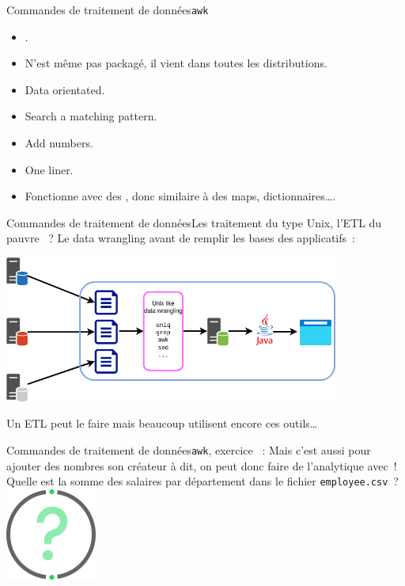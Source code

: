 \documentclass{beamer}
\begin{document}
    \begin{frame}{Commandes de traitement de données}{\lstinline{awk}}
        \begin{itemize}
            \item {}.
            \item N'est même pas packagé, il vient dans toutes les distributions.
            \item Data orientated.
            \item Search a matching pattern.
            \item Add numbers.
            \item One liner.
            \item Fonctionne avec des , donc similaire à des maps, dictionnaires\ldots.
        \end{itemize}
    \end{frame}

    \begin{frame}{Commandes de traitement de données}{Les traitement du type Unix, l'ETL du pauvre ~?}
        Le data wrangling avant de remplir les bases des applicatifs~:
        \begin{center}
            \includegraphics[width=11cm]{image/pre-traitement-unix.drawio}
        \end{center}
        Un ETL peut le faire mais beaucoup utilisent encore ces outils\ldots
    \end{frame}

    \begin{frame}{Commandes de traitement de données}{\lstinline{awk}, exercice \execcounterdispinc{}~:}
        Mais c'est aussi pour ajouter des nombres son créateur à dit, on peut donc faire de l'analytique avec~!
        \bigbreak
        Quelle est la somme des salaires par département dans le fichier \lstinline{employee.csv}~?
        \bigbreak
        \centering
        \includegraphics[width=3cm]{image/question-mark}
    \end{frame}
\end{document}
